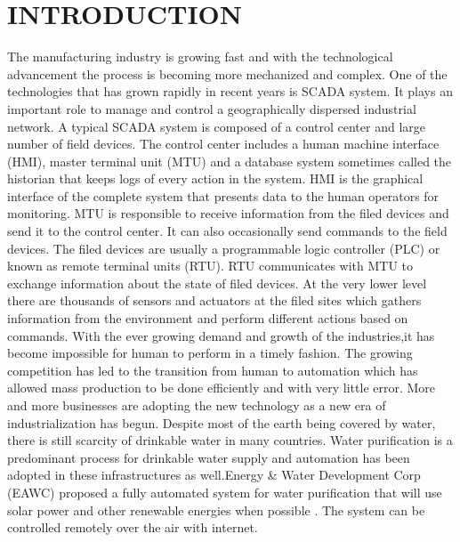 \documentclass[letterpaper, 10 pt, conference]{ieeeconf}  %
\begin{document}
\section{INTRODUCTION}
The manufacturing industry is growing fast and with the technological advancement the process is becoming more mechanized and complex. One of the technologies that has grown rapidly in recent years is SCADA system. It plays an important role to manage and control a geographically dispersed industrial network. A typical SCADA system is composed of a control center and large number of field devices. The control center includes a human machine interface (HMI), master terminal unit (MTU) and a database system sometimes called the historian that keeps logs of every action in the system. HMI is the graphical interface of the complete system that presents data to the human operators for monitoring. MTU is responsible to receive information from the filed devices and send it to the control center. It can also occasionally send commands to the field devices. The filed devices are usually a programmable logic controller (PLC) or known as remote terminal units (RTU). RTU communicates with MTU to exchange information about the state of filed devices. At the very lower level there are thousands of sensors and actuators at the filed sites which gathers information from the environment and perform different actions based on commands. With the ever growing demand and growth of the industries,it has become impossible for human to perform in a timely fashion. The growing competition has led to the transition from human to automation which has allowed mass production to be done efficiently and with very little error. More and more businesses are adopting the new technology as a new era of industrialization has begun. Despite most of the earth being covered by water, there is still scarcity of drinkable water in many countries. Water purification is a predominant process for drinkable water supply and automation has been adopted in these infrastructures as well.Energy \& Water Development Corp (EAWC) proposed a fully automated system for water purification that will use solar power and other renewable energies when possible \cite{c33}. The system can be controlled remotely over the air with internet. 
\end{document}
